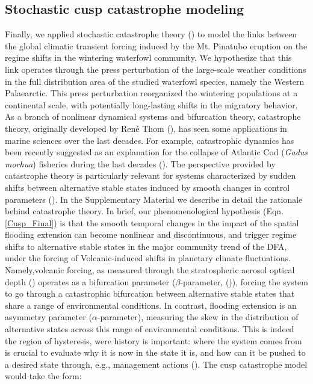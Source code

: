 \documentclass[12pt]{article}
\begin{document}
\subsection*{Stochastic cusp catastrophe modeling}
\label{subsec:Stochastic cusp catastrophe modeling}

Finally, we applied stochastic catastrophe theory (\cite{Cobb1985,Grasman2009}) to model the links between the global climatic transient forcing induced by the Mt. Pinatubo eruption on the regime shifts in the wintering waterfowl community. We hypothesize that this link operates through the press perturbation of the large-scale weather conditions in the full distribution area of the studied waterfowl species, namely the Western Palaearctic. This press perturbation reorganized the wintering populations at a continental scale, with potentially long-lasting shifts in the migratory behavior.\\

As a branch of nonlinear dynamical systems and bifurcation theory, catastrophe theory, originally developed by René Thom (\cite{Thom1975,Thom1977}), has seen some applications in marine sciences over the last decades. For example, catastrophic dynamics has been recently suggested as an explanation for the collapse of Atlantic Cod (\textit{Gadus morhua}) fisheries during the last decades (\cite{Sguotti2019}). The perspective provided by catastrophe theory is particularly relevant for systems characterized by sudden shifts between alternative stable states induced by smooth changes in control parameters (\cite{Casti1982,Loehle1989}). In the Supplementary Material we describe in detail the rationale behind catastrophe theory. In brief, our phenomenological hypothesis (Eqn. \ref{Cusp_Final}) is that the smooth temporal changes in the impact of the spatial flooding extension can become nonlinear and discontinuous, and trigger regime shifts to alternative stable states in the major community trend of the DFA, under the forcing of Volcanic-induced shifts in planetary climate fluctuations. Namely,volcanic forcing, as measured through the stratospheric aerosol optical depth (\cite{Booth2012}) operates as a bifurcation parameter ($\beta$-parameter, (\cite{Grasman2009})), forcing the system to go through a catastrophic bifurcation between alternative stable states that share a range of environmental conditions. In contrast, flooding extension is an asymmetry parameter ($\alpha$-parameter), measuring the skew in the distribution of alternative states across this range of environmental conditions. This is indeed the region of hysteresis, were history is important: where the system comes from is crucial to evaluate why it is now in the state it is, and how can it be pushed to a desired state through, e.g., management actions (\cite{Petraitis2013,Scheffer2009a,Scheffer2015a}). The cusp catastrophe model would take the form: \\
\end{document}
